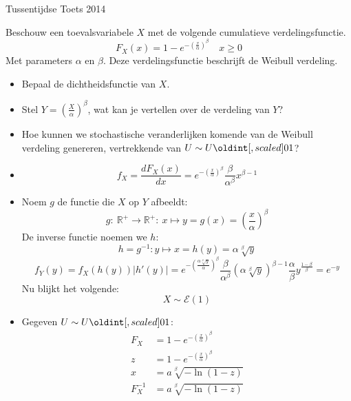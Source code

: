 \documentclass[main.tex]{subfiles}
\begin{document}
\begin{examenvraag}{Tussentijdse Toets 2014}
  \begin{ex-vraag}
    Beschouw een toevalsvariabele $X$ met de volgende cumulatieve verdelingsfunctie.
    \[ F_{X}(x) = 1 - e^{-\left(\frac{x}{\alpha}\right)^{\beta}} \quad x \ge 0 \]
    Met parameters $\alpha$ en $\beta$.
    Deze verdelingsfunctie beschrijft de Weibull verdeling.
    \begin{itemize}
    \item Bepaal de dichtheidsfunctie van $X$.
    \item Stel $Y = \left(\frac{X}{\alpha}\right)^{\beta}$, wat kan je vertellen over de verdeling van $Y$?
    \item Hoe kunnen we stochastische veranderlijken komende van de Weibull verdeling genereren, vertrekkende van $U \sim U\interval{0}{1}$? 
    \end{itemize}
  \end{ex-vraag}

  \begin{ex-antwoord}
    \begin{itemize}
    \item
      \[ f_{X} = \frac{dF_{X}(x)}{dx} = e^{-\left(\frac{x}{\alpha}\right)^{\beta}}\frac{\beta}{\alpha^{\beta}}x^{\beta-1} \]
      \needed
    \item 
      Noem $g$ de functie die $X$ op $Y$ afbeeldt:
      \[ g:\ \mathbb{R}^{+} \rightarrow \mathbb{R}^{+}:\ x \mapsto y = g(x) = \left(\frac{x}{\alpha}\right)^{\beta} \]
      De inverse functie noemen we $h$:
      \[ h = g^{-1}: y \mapsto x = h(y) = \alpha\sqrt[\beta]{y} \]
      \[ f_{Y}(y) = f_{X}(h(y))|h'(y)| = e^{-\left(\frac{\alpha\sqrt[\beta]{y}}{\alpha}\right)^{\beta}}\frac{\beta}{\alpha^{\beta}}\left(\alpha\sqrt[\beta]{y}\right)^{\beta-1} \frac{\alpha}{\beta}y^{\frac{1-\beta}{\beta}} = e^{-y} \]
      Nu blijkt het volgende:
      \[ X \sim \mathcal{E}(1) \]
    \item Gegeven $U \sim U\interval{0}{1}$:
      \[
      \begin{array}{rl}
        F_{X} &= 1 - e^{-\left(\frac{x}{\alpha}\right)^{\beta}}\\
        z &= 1 - e^{-\left(\frac{x}{\alpha}\right)^{\beta}}\\
        x &= a\sqrt[\beta]{-\ln(1-z)}\\
        F_{X}^{-1} &= a\sqrt[\beta]{-\ln(1-z)}\\
      \end{array}
      \]
    \end{itemize}
  \end{ex-antwoord}
\end{examenvraag}
\end{document}

